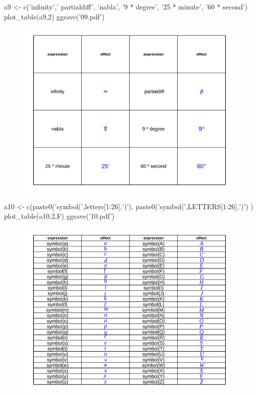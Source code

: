 \documentclass[10 pt,landscape]{article}
\begin{document}
\begin{multicols*}{3}
      \begin{R}
a9 <- c('infinity',' partialdiff',
        'nabla', '9 * degree',
        '25 * minute', '60 * second')
plot_table(a9,2)
ggsave('09.pdf')
     \end{R}
     
     \begin{figure}[H]
      \centering
        \includegraphics[width = 1\linewidth]{09.pdf}
      \end{figure}  
      
      \begin{R}
a10 <- c(paste0('symbol(',letters[1:26],')'),
         paste0('symbol(',LETTERS[1:26],')')
         )
plot_table(a10,2,F)
ggsave('10.pdf')
     \end{R}

   \begin{figure}[H]
      \centering
        \includegraphics[width = 1\linewidth]{10.pdf}
      \end{figure}
      

\end{multicols*}
\end{document}
